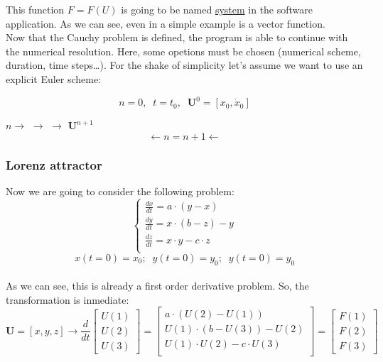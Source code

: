 This function $F=F(U)$ is going to be named \underline{system} in the software
application.
As we can see, even in a simple example is a vector function.\\

Now that the Cauchy problem is defined, the program is able to continue with the
numerical resolution. Here, some opetions must be chosen (numerical scheme,
duration, time steps\ldots). For the shake of simplicity let's assume we want to
use an explicit Euler scheme:\\

\begin{framed}
$$
n=0,\;\; t=t_0, \;\; \mathbf{U}^0=[x_0, \dot x_0]
$$

\begin{framed}
$n \rightarrow$ %
	$\rightarrow$
	$\rightarrow$
	$\mathbf{U}^{n+1}$ \\
	$$\longleftarrow n=n+1 \longleftarrow$$
\end{framed}

\end{framed}

\subsubsection*{Lorenz attractor}

Now we are going to consider the following problem: 
{\large{
$$
\begin{cases}
\frac{dx}{dt}= a \cdot ( y - x ) \\
\frac{dy}{dt} =x \cdot ( b - z ) - y \\ 
\frac{dz}{dt} =x \cdot y - c \cdot z \\
\end{cases}
$$
}}
$$
x(t=0)=x_0;\;\; y(t=0)=y_0;\;\; y(t=0)=y_0
$$\\

As we can see, this is already a first order derivative problem. So, the
transformation is inmediate: 
$$
\mathbf{U}=[x,y,z] \longrightarrow \frac{d}{dt} \begin{bmatrix}
U(1)\\
U(2)\\
U(3)
\end{bmatrix}= 
\begin{bmatrix}
a \cdot ( U(2) - U(1) ) \\
U(1) \cdot ( b - U(3) ) - U(2) \\ 
U(1) \cdot U(2) - c \cdot U(3) \\
\end{bmatrix}=\begin{bmatrix}
F(1)\\
F(2)\\
F(3)
\end{bmatrix}
$$\\

